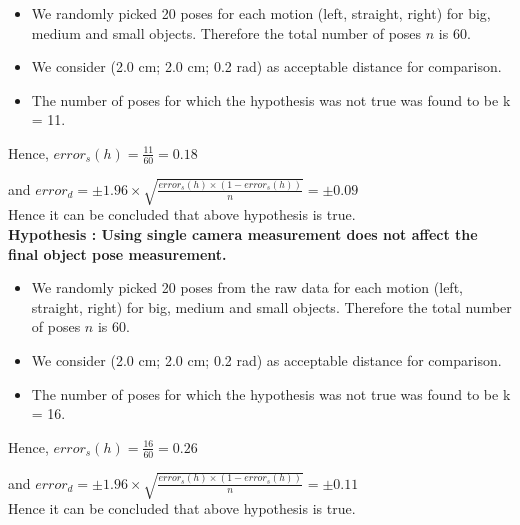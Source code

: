 \documentclass[10pt,a4paper]{article}
\begin{document}
					\begin{itemize}
						\item We randomly picked 20 poses for each motion (left, straight, right) for big, medium and small objects. Therefore the total number of poses $n$ is 60.
						
						\item We consider (2.0 cm; 2.0 cm; 0.2 rad) as acceptable distance for comparison.
						
						\item The number of poses for which the hypothesis was not true was found to be k = 11.
					\end{itemize}
					
					Hence, $error_s (h) = \frac{11}{60} = 0.18 $
					
					and $error_d = \pm 1.96 \times \sqrt{\frac{error_s (h) \times (1-error_s (h))}{n}} = \pm0.09$\\
					
					Hence it can be concluded that above hypothesis is true. \\
					
					\textbf{Hypothesis : Using single camera measurement does not affect the final object pose measurement.}
					
					\begin{itemize}
						\item We randomly picked 20 poses from the raw data for each motion (left, straight, right) for big, medium and small objects. Therefore the total number of poses $n$ is 60.
						
						\item We consider (2.0 cm; 2.0 cm; 0.2 rad) as acceptable distance for comparison.
						
						\item The number of poses for which the hypothesis was not true was found to be k = 16.
					\end{itemize}
					
					Hence, $error_s (h) = \frac{16}{60} = 0.26 $
					
					and $error_d = \pm 1.96 \times \sqrt{\frac{error_s (h) \times (1-error_s (h))}{n}} = \pm0.11$\\
					
					Hence it can be concluded that above hypothesis is true.
					
\end{document}
